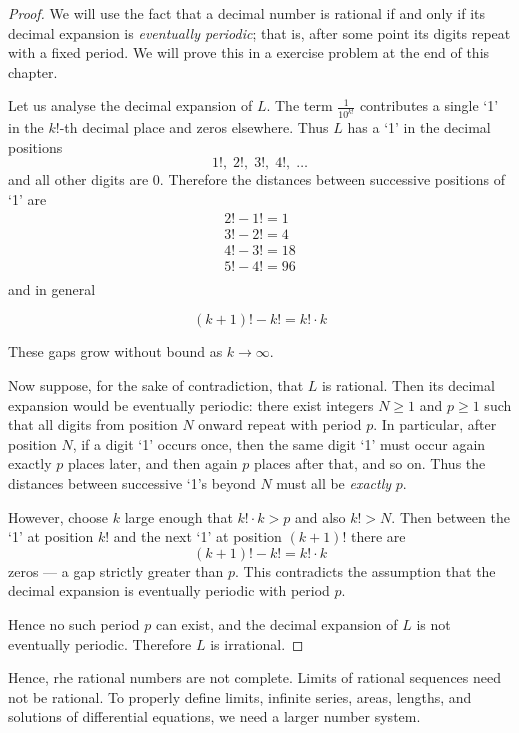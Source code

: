 \begin{proof}
We will use the fact that a decimal number is rational if and only if its decimal expansion is
\emph{eventually periodic}; that is, after some point its digits repeat with a
fixed period. We will prove this in a exercise problem at the end of this chapter.

Let us analyse the decimal expansion of $L$.  The term $\tfrac{1}{10^{k!}}$
contributes a single `1' in the $k!$-th decimal place and zeros elsewhere.
Thus $L$ has a `1' in the decimal positions
\[
1!, \; 2!,\; 3!,\; 4!,\; \dots
\]
and all other digits are $0$.  Therefore the distances between successive
positions of `1' are
\[
\begin{array}{c}
2! -1! = 1  \\
3! - 2! =4 \\
4! - 3! =18 \\
5! -4! =96 \\
\end{array}
\]
and in general

\[
(k+1)! - k! = k!\cdot k
\]


These gaps grow without bound as $k\to\infty$.

Now suppose, for the sake of contradiction, that $L$ is rational.  Then its
decimal expansion would be eventually periodic: there exist integers $N\ge 1$
and $p\ge 1$ such that all digits from position $N$ onward repeat with period
$p$.  In particular, after position $N$, if a digit `1' occurs once, then the
same digit `1' must occur again exactly $p$ places later, and then again $p$
places after that, and so on.  Thus the distances between successive `1's
beyond $N$ must all be \emph{exactly} $p$.

However, choose $k$ large enough that $k!\cdot k > p$ and also $k! > N$.
Then between the `1' at position $k!$ and the next `1' at position $(k+1)!$
there are
\[
(k+1)! - k! = k!\cdot k
\]
zeros --- a gap strictly greater than $p$.  This contradicts the assumption
that the decimal expansion is eventually periodic with period $p$.

Hence no such period $p$ can exist, and the decimal expansion of $L$ is not
eventually periodic.  Therefore $L$ is irrational.
\end{proof}


Hence, rhe rational numbers are not complete. Limits of rational sequences need not be rational. To properly define limits, infinite series, areas, lengths, and solutions of differential equations, we need a larger number system.

